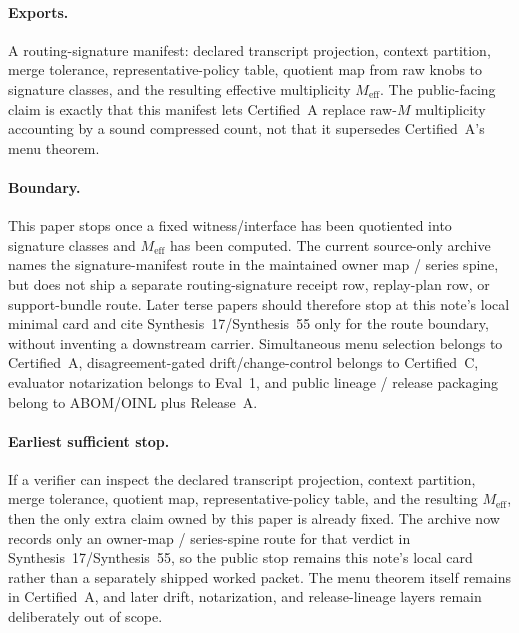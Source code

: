 \documentclass[11pt]{article}
\begin{document}
\paragraph{Exports.}
A routing-signature manifest: declared transcript projection, context partition, merge tolerance, representative-policy table, quotient map from raw knobs to signature classes, and the resulting effective multiplicity $M_{\mathrm{eff}}$. The public-facing claim is exactly that this manifest lets Certified~A replace raw-$M$ multiplicity accounting by a sound compressed count, not that it supersedes Certified~A's menu theorem.

\paragraph{Boundary.}
This paper stops once a fixed witness/interface has been quotiented into signature classes and $M_{\mathrm{eff}}$ has been computed.
The current source-only archive names the signature-manifest route in the maintained owner map / series spine, but does not ship a separate routing-signature receipt row, replay-plan row, or support-bundle route. Later terse papers should therefore stop at this note's local minimal card and cite Synthesis~17/Synthesis~55 only for the route boundary, without inventing a downstream carrier. Simultaneous menu selection belongs to Certified~A, disagreement-gated drift/change-control belongs to Certified~C, evaluator notarization belongs to Eval~1, and public lineage / release packaging belong to ABOM/OINL plus Release~A.\cite{series:workedexample,series:seriesspines,series:certifiedmenus,series:recert,series:eval1,series:releaseA}

\paragraph{Earliest sufficient stop.}
If a verifier can inspect the declared transcript projection, context partition, merge tolerance, quotient map, representative-policy table, and the resulting $M_{\mathrm{eff}}$, then the only extra claim owned by this paper is already fixed. The archive now records only an owner-map / series-spine route for that verdict in Synthesis~17/Synthesis~55, so the public stop remains this note's local card rather than a separately shipped worked packet. The menu theorem itself remains in Certified~A, and later drift, notarization, and release-lineage layers remain deliberately out of scope.\cite{series:workedexample,series:seriesspines}
\end{document}
